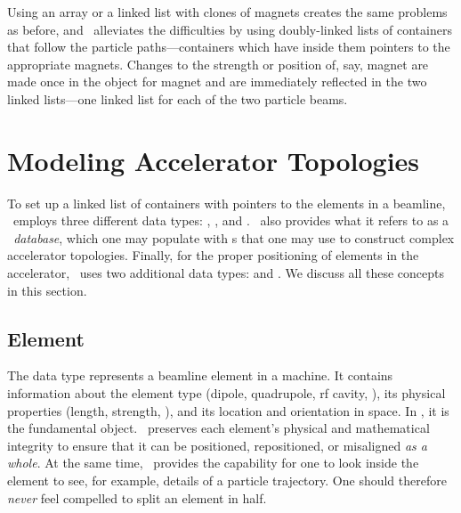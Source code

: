 %
Using an array or a linked list with clones of magnets creates
the same problems as before, and \PTC\ alleviates the difficulties
by using doubly-linked lists%
of containers that follow the particle
paths---containers which have inside them pointers to the appropriate
magnets. Changes to the strength or position of, say, magnet
 are made once in the object for magnet  and
are immediately reflected in the two linked lists---one linked list
for each of the two particle beams.


\section{Modeling Accelerator Topologies}
\label{sec:accel.topo}

%
%
To set up a linked list of containers with pointers to the elements
in a beamline, \PTC\ employs three different data types:
, , and .
\PTC\ also provides what it refers to as a \emph{\DNA\ database},
which one may populate with s that one may use to
construct complex accelerator topologies. Finally, for the proper
positioning of elements in the accelerator, \PTC\ uses two additional
data types:  and . We discuss all these
concepts in this section.


\subsection{Element}

%
The data type  represents a beamline element in a
machine. It contains information about the element type (dipole,
quadrupole, rf cavity, \etc), its physical properties (length,
strength, \etc), and its location and orientation in space.  In
\PTC, it is the fundamental object. \PTC\ preserves each element's
physical and mathematical integrity to ensure that it can be
positioned, repositioned, or misaligned \emph{as a whole}. At the
same time, \PTC\ provides the capability for one to look inside the
element to see, for example, details of a particle trajectory. One
should therefore \emph{never} feel compelled to split an element in
half. 

